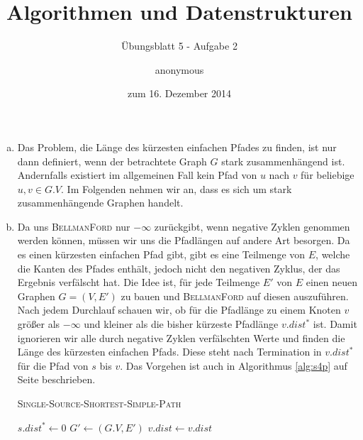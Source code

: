 \documentclass[a4paper]{scrartcl}
\title{Algorithmen und Datenstrukturen}
\subtitle{Übungsblatt 5 - Aufgabe 2}
\author{
    anonymous
}
\date{zum 16. Dezember 2014}
\begin{document}
\maketitle

\begin{enumerate}[(a)]
    \item
        Das Problem, die Länge des kürzesten einfachen Pfades zu finden, ist nur
        dann definiert, wenn der betrachtete Graph $G$ stark zusammenhängend
        ist.
        Andernfalls existiert im allgemeinen Fall kein Pfad von $u$ nach $v$ für
        beliebige $u, v \in G.V$.
        Im Folgenden nehmen wir an, dass es sich um stark zusammenhängende
        Graphen handelt.

    \item
        Da uns \textsc{BellmanFord} nur $-\infty$ zurückgibt, wenn negative
        Zyklen genommen werden können, müssen wir uns die Pfadlängen auf andere
        Art besorgen.
        Da es einen kürzesten einfachen Pfad gibt, gibt es eine Teilmenge von
        $E$, welche die Kanten des Pfades enthält, jedoch nicht den negativen
        Zyklus, der das Ergebnis verfälscht hat.
        Die Idee ist, für jede Teilmenge $E'$ von $E$ einen neuen Graphen
        $G = (V, E')$ zu bauen und \textsc{BellmanFord} auf diesen auszuführen.
        Nach jedem Durchlauf schauen wir, ob für die Pfadlänge zu einem Knoten
        $v$ größer als $-\infty$ und kleiner als die bisher kürzeste Pfadlänge
        $v.dist^*$ ist.
        Damit ignorieren wir alle durch negative Zyklen verfälschten Werte und
        finden die Länge des kürzesten einfachen Pfads.
        Diese steht nach Termination in $v.dist^*$ für die Pfad von $s$ bis $v$.
        Das Vorgehen ist auch in Algorithmus \ref{alg:s4p} auf Seite
        \pageref{alg:s4p} beschrieben.

        \begin{algorithm}
            \caption{\textsc{Single-Source-Shortest-Simple-Path}}
            \label{alg:s4p}
            \begin{algorithmic}[1]
                    \EndFor
                    \State $s.dist^* \gets 0$
                        \State $G' \gets (G.V, E')$
                        \State {}
                                \State $v.dist \gets v.dist$
                            \EndIf
                        \EndFor
                    \EndFor
                \EndProcedure
            \end{algorithmic}
        \end{algorithm}


\end{enumerate}
\end{document}
